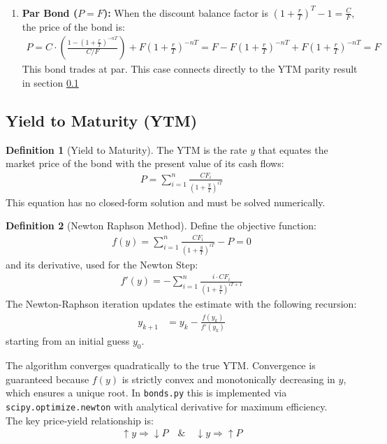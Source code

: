 \documentclass{article}
\theoremstyle{definition}  %
\newtheorem{definition}{Definition}[section]
\theoremstyle{plain}  %
\numberwithin{definition}{section}
\numberwithin{proposition}{section}
\numberwithin{theorem}{section}
\numberwithin{equation}{section}
\begin{document}
\begin{enumerate}
    \item \textbf{Par Bond ($P = F$):} When the discount balance factor is $\left(1 + \frac{r}{T}\right)^{T} - 1 = \frac{C}{F}$, the price of the bond is:
    \begin{align*}
        P = C \cdot \left(\frac{1 - (1 + \frac{r}{T})^{-n T}}{C/F}\right) + F \left(1 + \frac{r}{T}\right)^{-n T} = F -  F \left(1 + \frac{r}{T}\right)^{-n T} +  F \left(1 + \frac{r}{T}\right)^{-n T} = F
    \end{align*}
    This bond trades at par. This case connects directly to the YTM parity result in section \ref{subsec:ytm}
\end{enumerate}

\subsection{Yield to Maturity (YTM)}
\label{subsec:ytm}

\begin{definition}[Yield to Maturity]
    The YTM is the rate $y$ that equates the market price of the bond with the present value of its cash flows:
    \begin{align*}
        P = \sum_{i = 1}^{n} \frac{CF_{i}}{(1 + \frac{y}{T})^{iT}}
    \end{align*}
    This equation has no closed-form solution and must be solved numerically.
\end{definition}

\begin{definition}[Newton Raphson Method]
    Define the objective function:
    \begin{align*}
        f(y) = \sum_{i = 1}^{n} \frac{CF_{i}}{(1 + \frac{y}{T})^{iT}} - P = 0
    \end{align*}
    and its derivative, used for the Newton Step:
    \begin{align*}
        f'(y) = - \sum_{i = 1}^{n} \frac{i \cdot CF_{i}}{(1 + \frac{y}{T})^{iT + 1}}
    \end{align*}
    The Newton-Raphson iteration updates the estimate with the following recursion:
    \begin{align*}
        y_{k + 1} &= y_{k} - \frac{f(y_{k})}{f'(y_{k})}
    \end{align*}
    starting from an initial guess $y_{0}$.
\end{definition}

The algorithm converges quadratically to the true YTM. Convergence is guaranteed because $f(y)$ is strictly convex and monotonically decreasing in $y$, which ensures a unique root. In \color{magenta} \texttt{bonds.py} \color{black} this is implemented via \texttt{scipy.optimize.newton} with analytical derivative for maximum efficiency.\\
The key price-yield relationship is:
\begin{align*}
    \uparrow y \Rightarrow \downarrow P \quad \& \quad \downarrow y \Rightarrow \uparrow P
\end{align*}
\end{document}
